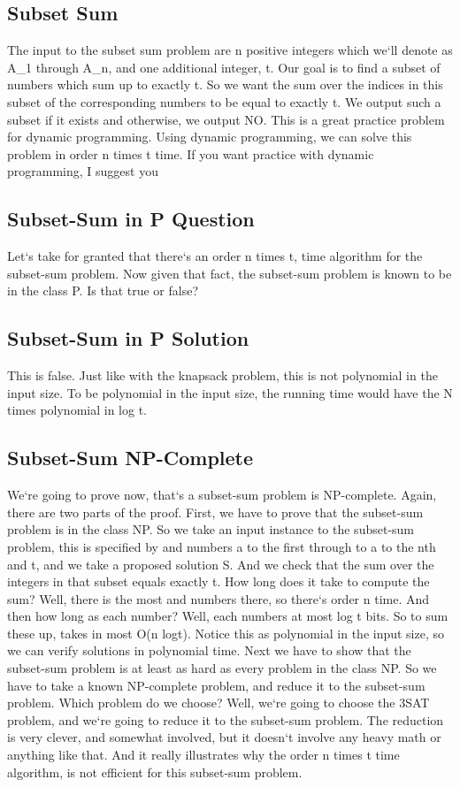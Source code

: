 \subsection{Subset Sum}
The input to the subset sum problem are n positive integers which we`ll denote as A\_1 through A\_n, and one additional integer, t.
Our goal is to find a subset of numbers which sum up to exactly t.
So we want the sum over the indices in this subset of the corresponding numbers to be equal to exactly t.
We output such a subset if it exists and otherwise, we output NO\@.
This is a great practice problem for dynamic programming.
Using dynamic programming, we can solve this problem in order n times t time.
If you want practice with dynamic programming, I suggest you

\subsection{Subset-Sum in P Question}
Let`s take for granted that there`s an order n times t, time algorithm for the subset-sum problem.
Now given that fact, the subset-sum problem is known to be in the class P\@.
Is that true or false?

\subsection{Subset-Sum in P Solution}
This is false.
Just like with the knapsack problem, this is not polynomial in the input size.
To be polynomial in the input size, the running time would have the N times polynomial in log t.

\subsection{Subset-Sum NP-Complete}
We`re going to prove now, that`s a subset-sum problem is NP-complete.
Again, there are two parts of the proof.
First, we have to prove that the subset-sum problem is in the class NP\@.
So we take an input instance to the subset-sum problem, this is specified by and numbers a to the first through to a to the nth and t, and we take a proposed solution S\@.
And we check that the sum over the integers in that subset equals exactly t.
How long does it take to compute the sum? Well, there is the most and numbers there, so there`s order n time.
And then how long as each number? Well, each numbers at most log t bits.
So to sum these up, takes in most O(n logt).
Notice this as polynomial in the input size, so we can verify solutions in polynomial time.
Next we have to show that the subset-sum problem is at least as hard as every problem in the class NP\@.
So we have to take a known NP-complete problem, and reduce it to the subset-sum problem.
Which problem do we choose? Well, we`re going to choose the 3SAT problem, and we`re going to reduce it to the subset-sum problem.
The reduction is very clever, and somewhat involved, but it doesn`t involve any heavy math or anything like that.
And it really illustrates why the order n times t time algorithm, is not efficient for this subset-sum problem.

